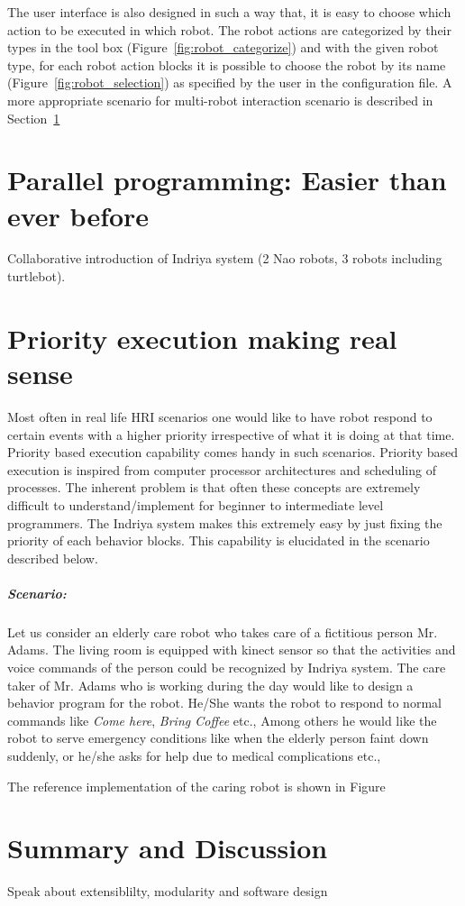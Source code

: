 The user interface is also designed in such a way that, it is easy to choose which action to be executed in which robot. The robot actions are categorized by their types in the tool box (Figure~\ref{fig:robot_categorize}) and with the given robot type, for each robot action blocks it is possible to choose the robot by its name (Figure~\ref{fig:robot_selection}) as specified by the user in the configuration file.
A more appropriate scenario for multi-robot interaction scenario is described in Section~\ref{sec:parallel_programming}

\section{Parallel programming: Easier than ever before}
\label{sec:parallel_programming}
Collaborative introduction of Indriya system (2 Nao robots, 3 robots including turtlebot). 

\section{Priority execution making real sense}
Most often in real life HRI scenarios one would like to have robot respond to certain events with a higher priority irrespective of what it is doing at that time. Priority based execution capability comes handy in such scenarios. Priority based execution is inspired from computer processor architectures and scheduling of processes. The inherent problem is that often these concepts are extremely difficult to understand/implement for beginner to intermediate level programmers. The Indriya system makes this extremely easy by just fixing the priority of each behavior blocks. This capability is elucidated in the scenario described below. 

\subparagraph{Scenario:}Let us consider an elderly care robot who takes care of a fictitious person Mr. Adams. The living room is equipped with kinect sensor so that the activities and voice commands of the person could be recognized by Indriya system. The care taker of Mr. Adams who is working during the day would like to design a behavior program for the robot. He/She wants the robot to respond to normal commands like \emph{Come here}, \emph{Bring Coffee} etc., Among others he would like the robot to serve emergency conditions like when the elderly person faint down suddenly, or he/she asks for help due to medical complications etc.,

The reference implementation of the caring robot is shown in Figure~

\section{Summary and Discussion}

Speak about extensiblilty, modularity and software design